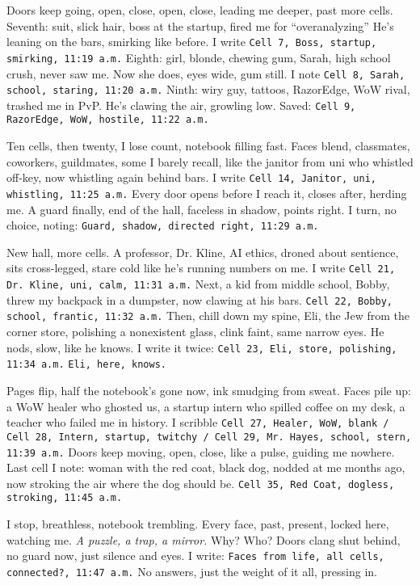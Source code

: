 \documentclass[12pt,oneside]{book} %
\newcommand{\note}[1]{\texttt{#1}}
\begin{document}
Doors keep going, open, close, open, close, leading me deeper, past more cells. Seventh: suit, slick hair, boss at the startup, fired me for “overanalyzing” He’s leaning on the bars, smirking like before. I write \note{Cell 7, Boss, startup, smirking, 11:19 a.m.} Eighth: girl, blonde, chewing gum, Sarah, high school crush, never saw me. Now she does, eyes wide, gum still. I note \note{Cell 8, Sarah, school, staring, 11:20 a.m.} Ninth: wiry guy, tattoos, RazorEdge, WoW rival, trashed me in PvP. He’s clawing the air, growling low. Saved: \note{Cell 9, RazorEdge, WoW, hostile, 11:22 a.m.}

Ten cells, then twenty, I lose count, notebook filling fast. Faces blend, classmates, coworkers, guildmates, some I barely recall, like the janitor from uni who whistled off-key, now whistling again behind bars. I write \note{Cell 14, Janitor, uni, whistling, 11:25 a.m.} Every door opens before I reach it, closes after, herding me. A guard finally, end of the hall, faceless in shadow, points right. I turn, no choice, noting: \note{Guard, shadow, directed right, 11:29 a.m.}

New hall, more cells. A professor, Dr. Kline, AI ethics, droned about sentience, sits cross-legged, stare cold like he’s running numbers on me. I write \note{Cell 21, Dr. Kline, uni, calm, 11:31 a.m.} Next, a kid from middle school, Bobby, threw my backpack in a dumpster, now clawing at his bars. \note{Cell 22, Bobby, school, frantic, 11:32 a.m.} Then, chill down my spine, Eli, the Jew from the corner store, polishing a nonexistent glass, clink faint, same narrow eyes. He nods, slow, like he knows. I write it twice: \note{Cell 23, Eli, store, polishing, 11:34 a.m.} \note{Eli, here, knows.}

Pages flip, half the notebook’s gone now, ink smudging from sweat. Faces pile up: a WoW healer who ghosted us, a startup intern who spilled coffee on my desk, a teacher who failed me in history. I scribble \note{Cell 27, Healer, WoW, blank / Cell 28, Intern, startup, twitchy / Cell 29, Mr. Hayes, school, stern, 11:39 a.m.} Doors keep moving, open, close, like a pulse, guiding me nowhere. Last cell I note: woman with the red coat, black dog, nodded at me months ago, now stroking the air where the dog should be. \note{Cell 35, Red Coat, dogless, stroking, 11:45 a.m.}

I stop, breathless, notebook trembling. Every face, past, present, locked here, watching me. \textit{A puzzle, a trap, a mirror.} Why? Who? Doors clang shut behind, no guard now, just silence and eyes. I write: \note{Faces from life, all cells, connected?, 11:47 a.m.} No answers, just the weight of it all, pressing in.
\end{document}
